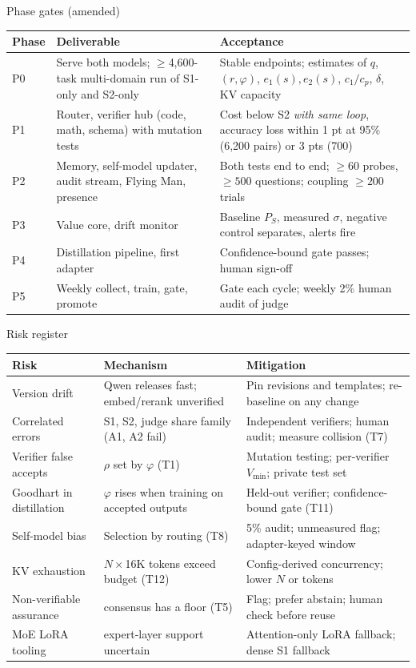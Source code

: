 \documentclass[aspectratio=169,10pt]{beamer}
\begin{document}
\begin{frame}{Phase gates (amended)}
\scriptsize\centering
\begin{tabular}{@{}p{2.3cm}p{5.0cm}p{6.0cm}@{}}
\toprule
Phase & Deliverable & Acceptance\\\midrule
P0 & Serve both models; $\ge$4,600-task multi-domain run of S1-only and S2-only & Stable endpoints; estimates of $q$, $(r,\varphi)$, $e_1(s),e_2(s)$, $c_1/c_p$, $\delta$, KV capacity\\
P1 & Router, verifier hub (code, math, schema) with mutation tests & Cost below S2 \emph{with same loop}, accuracy loss within 1 pt at 95\% (6,200 pairs) or 3 pts (700)\\
P2 & Memory, self-model updater, audit stream, Flying Man, presence & Both tests end to end; $\ge60$ probes, $\ge500$ questions; coupling $\ge200$ trials\\
P3 & Value core, drift monitor & Baseline $P_S$, measured $\sigma$, negative control separates, alerts fire\\
P4 & Distillation pipeline, first adapter & Confidence-bound gate passes; human sign-off\\
P5 & Weekly collect, train, gate, promote & Gate each cycle; weekly 2\% human audit of judge\\\bottomrule
\end{tabular}
\end{frame}

\begin{frame}{Risk register}
\scriptsize\centering
\begin{tabular}{@{}p{3.2cm}p{4.3cm}p{5.6cm}@{}}
\toprule
Risk & Mechanism & Mitigation\\\midrule
Version drift & Qwen releases fast; embed/rerank unverified & Pin revisions and templates; re-baseline on any change\\
Correlated errors & S1, S2, judge share family (A1, A2 fail) & Independent verifiers; human audit; measure collision (T7)\\
Verifier false accepts & $\rho$ set by $\varphi$ (T1) & Mutation testing; per-verifier $V_{\min}$; private test set\\
Goodhart in distillation & $\varphi$ rises when training on accepted outputs & Held-out verifier; confidence-bound gate (T11)\\
Self-model bias & Selection by routing (T8) & 5\% audit; unmeasured flag; adapter-keyed window\\
KV exhaustion & $N\times$16K tokens exceed budget (T12) & Config-derived concurrency; lower $N$ or tokens\\
Non-verifiable assurance & consensus has a floor (T5) & Flag; prefer abstain; human check before reuse\\
MoE LoRA tooling & expert-layer support uncertain & Attention-only LoRA fallback; dense S1 fallback\\\bottomrule
\end{tabular}
\end{frame}
\end{document}
